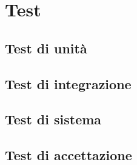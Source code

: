 \section{Test}
\subsection{Test di unità}
\subsection{Test di integrazione}
\subsection{Test di sistema}
\subsection{Test di accettazione}
